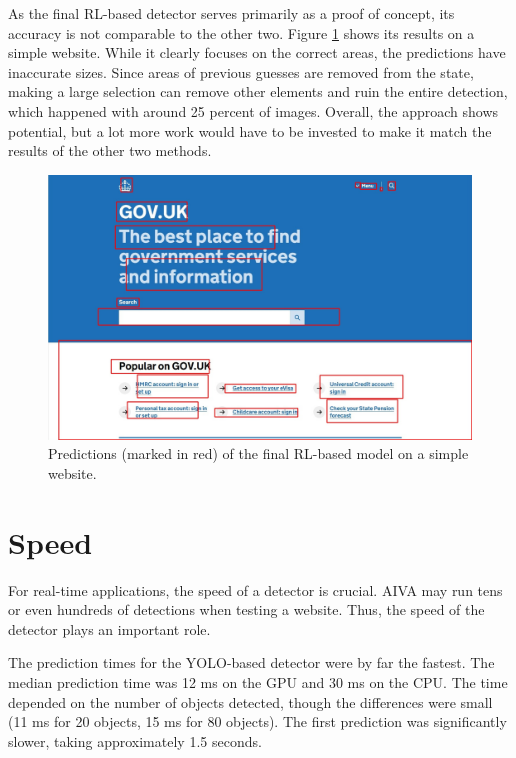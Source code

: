 \documentclass[
  digital,     %
  oneside,     %
  nosansbold,  %
  nocolorbold, %
  lof,         %
  lot,         %
]{fithesis4}
\begin{document}
As the final RL-based detector serves primarily as a proof of concept, its accuracy is not comparable to the other two. Figure \ref{fig:gov_predict_rl} shows its results on a simple website. While it clearly focuses on the correct areas, the predictions have inaccurate sizes. Since areas of previous guesses are removed from the state, making a large selection can remove other elements and ruin the entire detection, which happened with around 25 percent of images. Overall, the approach shows potential, but a lot more work would have to be invested to make it match the results of the other two methods.

\begin{figure}
    \centering
    \includegraphics[width=1\linewidth]{results/rl_pred_gov.jpg}
    \caption{Predictions (marked in red) of the final RL-based model on a simple website.}
    \label{fig:gov_predict_rl}
\end{figure}

\section{Speed}
\label{sec:speed}

For real-time applications, the speed of a detector is crucial. AIVA may run tens or even hundreds of detections when testing a website. Thus, the speed of the detector plays an important role.

The prediction times for the YOLO-based detector were by far the fastest. The median prediction time was 12 ms on the GPU and 30 ms on the CPU. The time depended on the number of objects detected, though the differences were small (11 ms for 20 objects, 15 ms for 80 objects). The first prediction was significantly slower, taking approximately 1.5 seconds.
\end{document}
